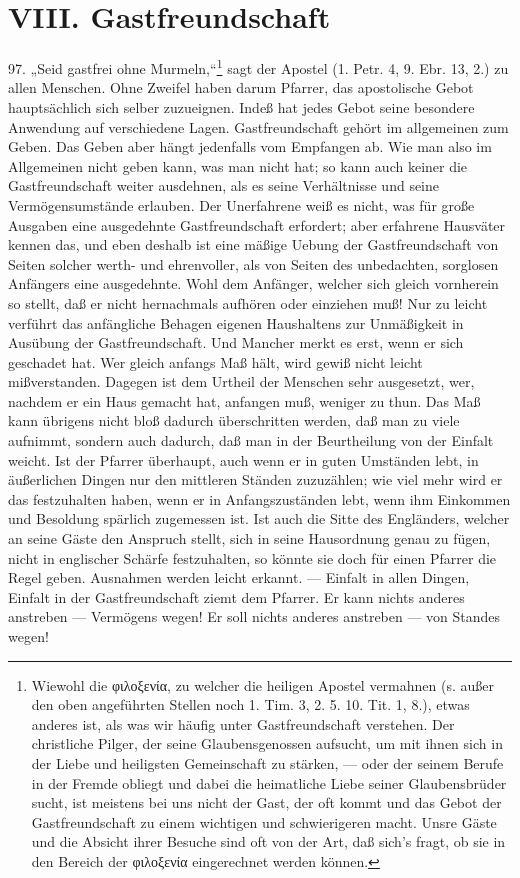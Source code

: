\section{VIII. Gastfreundschaft}

97. „Seid gastfrei ohne Murmeln,“\footnote{Wiewohl die φιλοξενία, zu welcher die heiligen Apostel vermahnen (s. außer den oben angeführten Stellen noch 1. Tim. 3, 2. 5. 10. Tit. 1, 8.), etwas anderes ist, als was wir häufig unter Gastfreundschaft verstehen. Der christliche Pilger, der seine Glaubensgenossen aufsucht, um mit ihnen sich in der Liebe und heiligsten Gemeinschaft zu stärken, — oder der seinem Berufe in der Fremde obliegt und dabei die heimatliche Liebe seiner Glaubensbrüder sucht, ist meistens bei uns nicht der Gast, der oft kommt und das Gebot der Gastfreundschaft zu einem wichtigen und schwierigeren macht. Unsre Gäste und die Absicht ihrer Besuche sind oft von der Art, daß sich’s fragt, ob sie in den Bereich der φιλοξενία eingerechnet werden können.} sagt der Apostel (1. Petr. 4, 9. Ebr. 13, 2.) zu allen Menschen. Ohne
Zweifel haben darum Pfarrer, das apostolische Gebot hauptsächlich sich selber zuzueignen. Indeß hat jedes Gebot seine besondere Anwendung auf verschiedene Lagen. Gastfreundschaft gehört im allgemeinen zum Geben. Das Geben aber hängt jedenfalls vom Empfangen ab. Wie man also im Allgemeinen nicht geben kann, was man nicht hat; so kann auch keiner die Gastfreundschaft weiter ausdehnen, als es seine Verhältnisse und seine Vermögensumstände erlauben. Der Unerfahrene weiß es nicht, was für große Ausgaben eine ausgedehnte Gastfreundschaft erfordert; aber erfahrene Hausväter kennen das, und eben deshalb ist eine mäßige Uebung der Gastfreundschaft von Seiten solcher werth- und ehrenvoller, als von Seiten des unbedachten, sorglosen Anfängers eine ausgedehnte. Wohl dem Anfänger, welcher sich gleich vornherein so stellt, daß er nicht hernachmals aufhören oder einziehen muß! Nur zu leicht verführt das anfängliche Behagen eigenen Haushaltens zur Unmäßigkeit in Ausübung der Gastfreundschaft. Und Mancher merkt es erst, wenn er sich geschadet hat. Wer gleich anfangs Maß hält, wird gewiß nicht leicht mißverstanden. Dagegen ist dem Urtheil der Menschen sehr ausgesetzt, wer, nachdem er ein Haus gemacht hat, anfangen muß, weniger zu thun. Das Maß kann übrigens nicht bloß dadurch überschritten werden, daß man zu viele
aufnimmt, sondern auch dadurch, daß man in der Beurtheilung von der Einfalt weicht. Ist der Pfarrer überhaupt, auch wenn er in guten Umständen lebt, in äußerlichen Dingen nur den mittleren Ständen zuzuzählen; wie viel mehr wird er das festzuhalten haben, wenn er in Anfangszuständen lebt, wenn ihm Einkommen und Besoldung spärlich zugemessen ist. Ist auch die Sitte des Engländers, welcher an seine Gäste den Anspruch stellt, sich in seine Hausordnung genau zu fügen, nicht in englischer Schärfe festzuhalten, so könnte sie doch für einen Pfarrer die Regel geben. Ausnahmen werden leicht erkannt. — Einfalt in allen Dingen, Einfalt in der Gastfreundschaft ziemt dem Pfarrer. Er kann nichts anderes anstreben — Vermögens wegen! Er soll nichts anderes anstreben — von Standes wegen!

